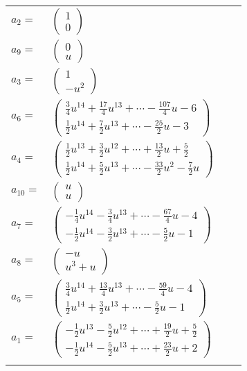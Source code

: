 \documentclass[1p]{elsarticle_modified}
\theoremstyle{definition}
\begin{document}
\begin{tabular}{m{7pt} m{180pt} m{7pt} m{180pt} }
\flushright $a_{2}=$&$\begin{pmatrix}1\\0\end{pmatrix}$ \\
\flushright $a_{9}=$&$\begin{pmatrix}0\\u\end{pmatrix}$ \\
\flushright $a_{3}=$&$\begin{pmatrix}1\\- u^2\end{pmatrix}$ \\
\flushright $a_{6}=$&$\begin{pmatrix}\frac{3}{4} u^{14}+\frac{17}{4} u^{13}+\cdots-\frac{107}{4} u-6\\\frac{1}{2} u^{14}+\frac{7}{2} u^{13}+\cdots-\frac{25}{2} u-3\end{pmatrix}$ \\
\flushright $a_{4}=$&$\begin{pmatrix}\frac{1}{2} u^{13}+\frac{3}{2} u^{12}+\cdots+\frac{13}{2} u+\frac{5}{2}\\\frac{1}{2} u^{14}+\frac{5}{2} u^{13}+\cdots-\frac{33}{2} u^2-\frac{7}{2} u\end{pmatrix}$ \\
\flushright $a_{10}=$&$\begin{pmatrix}u\\u\end{pmatrix}$ \\
\flushright $a_{7}=$&$\begin{pmatrix}-\frac{1}{4} u^{14}-\frac{3}{4} u^{13}+\cdots-\frac{67}{4} u-4\\-\frac{1}{2} u^{14}-\frac{3}{2} u^{13}+\cdots-\frac{5}{2} u-1\end{pmatrix}$ \\
\flushright $a_{8}=$&$\begin{pmatrix}- u\\u^3+u\end{pmatrix}$ \\
\flushright $a_{5}=$&$\begin{pmatrix}\frac{3}{4} u^{14}+\frac{13}{4} u^{13}+\cdots-\frac{59}{4} u-4\\\frac{1}{2} u^{14}+\frac{3}{2} u^{13}+\cdots-\frac{5}{2} u-1\end{pmatrix}$ \\
\flushright $a_{1}=$&$\begin{pmatrix}-\frac{1}{2} u^{13}-\frac{5}{2} u^{12}+\cdots+\frac{19}{2} u+\frac{5}{2}\\-\frac{1}{2} u^{14}-\frac{5}{2} u^{13}+\cdots+\frac{23}{2} u+2\end{pmatrix}$\\&\end{tabular}
\end{document}
